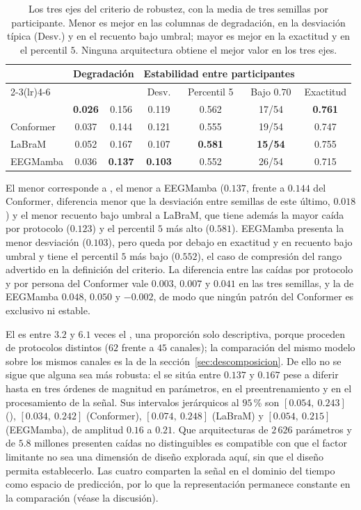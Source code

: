 \begin{table}[H]
\centering
\caption{Los tres ejes del criterio de robustez, con la media de tres semillas por participante.
Menor es mejor en las columnas de
degradación, en la desviación típica (Desv.) y en el recuento bajo umbral; mayor es mejor en la exactitud y en el percentil
$5$. Ninguna arquitectura obtiene el mejor valor en los tres ejes.}
\label{tab:robustez}
\small
\begin{tabular}{lcccccc}
\toprule
 & \multicolumn{2}{c}{\textbf{Degradación}} & \multicolumn{3}{c}{\textbf{Estabilidad entre participantes}} & \\
\cmidrule(lr){2-3}\cmidrule(lr){4-6}
 & \dsi{} & \idp{} & Desv. & Percentil 5 & Bajo $0.70$ & Exactitud \loso{} \\
\midrule
\eegnet{} & \textbf{0.026} & 0.156 & 0.119 & 0.562 & 17/54 & \textbf{0.761} \\
Conformer & 0.037 & 0.144 & 0.121 & 0.555 & 19/54 & 0.747 \\
LaBraM & 0.052 & 0.167 & 0.107 & \textbf{0.581} & \textbf{15/54} & 0.755 \\
EEGMamba & 0.036 & \textbf{0.137} & \textbf{0.103} & 0.552 & 26/54 & 0.715 \\
\bottomrule
\end{tabular}
\end{table}

El menor \dsi{} corresponde a \eegnet{}, el menor \idp{} a EEGMamba ($0.137$, frente a $0.144$ del Conformer,
diferencia menor que la desviación entre semillas de este último, $0.018$) y el menor recuento bajo umbral a
LaBraM, que tiene además la mayor caída por protocolo ($0.123$) y el percentil $5$ más alto ($0.581$).
EEGMamba presenta la menor desviación ($0.103$), pero queda por debajo en exactitud y en recuento bajo umbral
y tiene el percentil $5$ más bajo ($0.552$), el caso de compresión del rango advertido en la definición del
criterio. La diferencia entre las caídas por protocolo y por persona del Conformer vale $0.003$, $0.007$ y
$0.041$ en las tres semillas, y la de EEGMamba $0.048$, $0.050$ y $-0.002$, de modo que ningún patrón del
Conformer es exclusivo ni estable.

El \idp{} es entre $3.2$ y $6.1$ veces el \dsi{}, una proporción solo descriptiva, porque proceden de
protocolos distintos ($62$ frente a $45$ canales); la comparación del mismo modelo sobre los mismos canales es
la de la sección~\ref{sec:descomposicion}. De ello no se sigue que alguna sea más robusta: el \idp{} se
sitúa entre $0.137$ y $0.167$ pese a diferir hasta en tres órdenes de magnitud en parámetros, en el
preentrenamiento y en el procesamiento de la señal. Sus intervalos jerárquicos al $95$\,\% son $[0.054,\
0.243]$ (\eegnet{}), $[0.034,\ 0.242]$ (Conformer), $[0.074,\ 0.248]$ (LaBraM) y $[0.054,\ 0.215]$ (EEGMamba),
de amplitud $0.16$ a $0.21$. Que arquitecturas de $2\,626$ parámetros y de $5.8$ millones presenten caídas no
distinguibles es compatible con que el factor limitante no sea una dimensión de diseño explorada aquí, sin que
el diseño permita establecerlo. Las cuatro comparten la señal en el dominio del tiempo como espacio de
predicción, por lo que la representación permanece constante en la comparación (véase la discusión).


